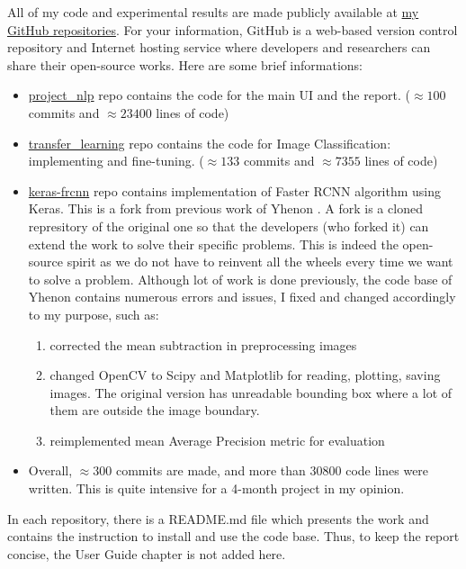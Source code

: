 All of my code and experimental results are made publicly available at  \href{https://github.com/vuhonganh?tab=repositories}{my GitHub repositories}. For your information, GitHub is a web-based version control repository and Internet hosting service where developers and researchers can share their open-source works. Here are some brief informations:
\begin{itemize}
	\item \href{https://github.com/vuhonganh/project_nlp}{project\_nlp} repo contains the code for the main UI and the report. ($\approx 100$ commits and $\approx 23400$ lines of code)
	\item \href{https://github.com/vuhonganh/transfer_learning}{transfer\_learning} repo contains the code for Image Classification: implementing and fine-tuning. ($\approx 133$ commits and $\approx 7355$ lines of code)
	\item \href{https://github.com/vuhonganh/keras-frcnn}{keras-frcnn} repo contains implementation of Faster RCNN algorithm using Keras. This is a fork from previous work of Yhenon \cite{kerasFrcnn}. A fork is a cloned represitory of the original one so that the developers (who forked it) can extend the work to solve their specific problems. This is indeed the open-source spirit as we do not have to reinvent all the wheels every time we want to solve a problem. Although lot of work is done previously, the code base of Yhenon contains numerous errors and issues, I fixed and changed accordingly to my purpose, such as:
	\begin{enumerate}
		\item corrected the mean subtraction in preprocessing images
		\item changed OpenCV to Scipy and Matplotlib for reading, plotting, saving images. The original version has unreadable bounding box where a lot of them are outside the image boundary.
		\item reimplemented mean Average Precision metric for evaluation
	\end{enumerate}
	\item Overall, $\approx 300$ commits are made, and more than $30800$ code lines were written. This is quite intensive for a 4-month project in my opinion.
\end{itemize}

In each repository, there is a README.md file which presents the work and contains the instruction to install and use the code base. Thus, to keep the report concise, the User Guide chapter is not added here.